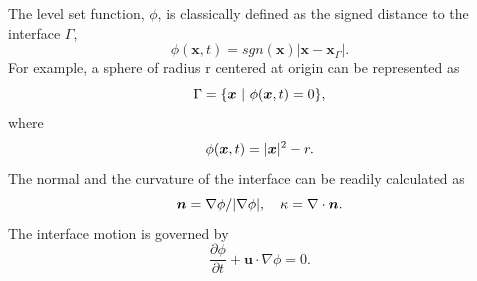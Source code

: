 \begin{frame}[t]
\begin{columns}[T]
\begin{column}{0.5\textwidth}
{\begin{bluecolorbox}
        The level set function, $\phi$, is classically defined as the signed distance to the interface $\Gamma$,
        \begin{equation} 
          \phi({\bm x},t) = sgn({\bm x}) |{\bm x}-{\bm x}_\Gamma|.
        \end{equation}
        For example, a sphere of radius r centered at origin can be represented as
        \begin{equation} \notag
          \Gamma = \{ {\bm x} ~ \rvert ~ \phi({\bm x},t) = 0 \},
        \end{equation}
        where
        \begin{equation} \notag
          \phi({\bm x},t) = |{\bm x}|^2 -r.
        \end{equation}
        The normal and the curvature of the interface can be readily calculated as
        \begin{equation}
          {\bm n} = \nabla \phi / \lvert \nabla \phi \rvert, \quad \kappa = \nabla \cdot {\bm n}.
        \end{equation}
        The interface motion is governed by
        \begin{equation} \label{eq:ls-avd}
          \frac{\partial \phi}{\partial t} + \bm{u} \cdot \nabla \phi = 0.
        \end{equation}
        
      \end{bluecolorbox}
      } %
    \end{column}
    
  \end{columns}

\end{frame}
